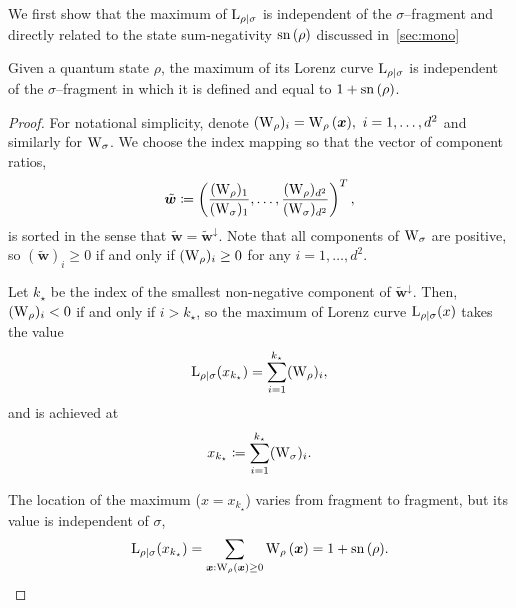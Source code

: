 \documentclass[pra,
aps,
twocolumn,
superscriptaddress,
groupedaddress,
nofootinbib,
reprint
]{revtex4-1}
\begin{document}
We first show that the maximum of ${{\rm{L}}_{\rho|\sigma}}$ is independent of the $\sigma$--fragment and directly related to the state sum-negativity ${{\rm{sn}}\left(\rho\right)}$ discussed in~\cref{sec:mono}
\begin{lemma}\label{lem:lcmax}
	Given a quantum state $\rho$, the maximum of its Lorenz curve ${{\rm{L}}_{\rho|\sigma}}$ is independent of the $\sigma$--fragment in which it is defined and equal to $1+{{\rm{sn}}\left(\rho\right)}$.
\end{lemma}
\begin{proof}
	For notational simplicity, denote $(\W{\rho})_i = \W[\bmx]{\rho},\ i = 1,\dots, d^2$ and similarly for $\W{\sigma}$.
	We choose the index mapping so that the vector of component ratios, 
	\begin{equation}
		\tilde{\bm{w}} \coloneqq \left(\frac{(\W{\rho})_1}{(\W{\sigma})_1}, \dots, \frac{(\W{\rho})_{d^2}}{(\W{\sigma})_{d^2}} \right)^T,
	\end{equation}
	is sorted in the sense that $\tilde{\bm{w}} = \tilde{\bm{w}}^\downarrow$.
	Note that all components of $\W{\sigma}$ are positive, so $(\tilde{\bm{w}})_i \geq 0$ if and only if $(\W{\rho})_i \geq 0$ for any $i=1,\dots,d^2$.
	
	Let $k_\star$ be the index of the smallest non-negative component of $\tilde{\bm{w}}^\downarrow$.
	Then, $(\W{\rho})_i < 0$ if and only if $i > k_\star$, so the maximum of Lorenz curve ${{\rm{L}}_{\rho|\sigma}}(x)$ takes the value 
	\begin{equation}
		\lc{\rho}{\sigma}(x_{k_\star}) = \sum_{i=1}^{k_\star} (\W{\rho})_i,
	\end{equation}
	and is achieved at
	\begin{equation}\label{eq:maxloc}
		x_{k_\star} \coloneqq \sum_{i=1}^{k_\star} (\W{\sigma})_i.
	\end{equation}

	The location of the maximum ($x=x_{k_\star}$) varies from fragment to fragment, but its value is independent of $\sigma$,
	\begin{equation}
		\lc{\rho}{\sigma}(x_{k_\star})
		= \sum\limits_{\bmx: \W[\bmx]{\rho} \geq 0} \W[\bmx]{\rho}
		= 1 + \sn{\rho}.
	\end{equation}
	
\end{proof}
\end{document}
